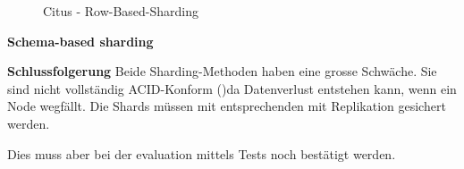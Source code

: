 \begin{flushleft}
\begin{flushleft}
\begin{flushleft}
\begin{figure}[H]
                \caption{Citus - Row-Based-Sharding}
                \label{fig:citus_row-based-sharding}
            \end{figure}
        \end{flushleft}
        \begin{flushleft}
            \textbf{Schema-based sharding}
        \end{flushleft}
        \begin{flushleft}
            \textbf{Schlussfolgerung}
            Beide Sharding-Methoden haben eine grosse Schwäche.
            Sie sind nicht vollständig ACID-Konform ()da Datenverlust entstehen kann, wenn ein Node wegfällt.
            Die Shards müssen mit entsprechenden mit Replikation gesichert werden\cite{4GDXA49I}.

            Dies muss aber bei der evaluation mittels Tests noch bestätigt werden.
        \end{flushleft}
    \end{flushleft}
\end{flushleft}
